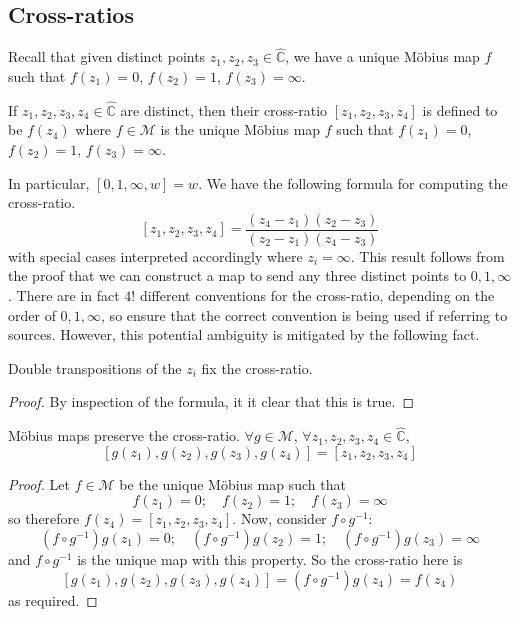 \subsection{Cross-ratios}
Recall that given distinct points \(z_1, z_2, z_3 \in \hat{\mathbb C}\), we have a unique M\"obius map \(f\) such that \(f(z_1) = 0\), \(f(z_2) = 1\), \(f(z_3) = \infty\).
\begin{definition}
	If \(z_1, z_2, z_3, z_4 \in \hat{\mathbb C}\) are distinct, then their cross-ratio \([z_1, z_2, z_3, z_4]\) is defined to be \(f(z_4)\) where \(f \in \mathcal M\) is the unique M\"obius map \(f\) such that \(f(z_1) = 0\), \(f(z_2) = 1\), \(f(z_3) = \infty\).
\end{definition}
In particular, \([0, 1, \infty, w] = w\).
We have the following formula for computing the cross-ratio.
\[
	[z_1, z_2, z_3, z_4] = \frac{(z_4 - z_1)(z_2 - z_3)}{(z_2 - z_1)(z_4 - z_3)}
\]
with special cases interpreted accordingly where \(z_i = \infty\).
This result follows from the proof that we can construct a map to send any three distinct points to \(0, 1, \infty\).
There are in fact \(4!
\) different conventions for the cross-ratio, depending on the order of \(0, 1, \infty\), so ensure that the correct convention is being used if referring to sources.
However, this potential ambiguity is mitigated by the following fact.
\begin{proposition}
	Double transpositions of the \(z_i\) fix the cross-ratio.
\end{proposition}
\begin{proof}
	By inspection of the formula, it it clear that this is true.
\end{proof}
\begin{theorem}
	M\"obius maps preserve the cross-ratio.
	\(\forall g \in \mathcal M\), \(\forall z_1, z_2, z_3, z_4 \in \hat{\mathbb C}\),
	\[
		[g(z_1), g(z_2), g(z_3), g(z_4)] = [z_1, z_2, z_3, z_4]
	\]
\end{theorem}
\begin{proof}
	Let \(f \in \mathcal M\) be the unique M\"obius map such that
	\[
		f(z_1) = 0;\quad f(z_2) = 1;\quad f(z_3) = \infty
	\]
	so therefore \(f(z_4) = [z_1, z_2, z_3, z_4]\).
	Now, consider \(f \circ g^{-1}\):
	\[
		(f \circ g^{-1})g(z_1) = 0;\quad (f \circ g^{-1})g(z_2) = 1;\quad (f \circ g^{-1})g(z_3) = \infty
	\]
	and \(f \circ g^{-1}\) is the unique map with this property.
	So the cross-ratio here is
	\[
		[g(z_1), g(z_2), g(z_3), g(z_4)] = (f \circ g^{-1})g(z_4) = f(z_4)
	\]
	as required.
\end{proof}
